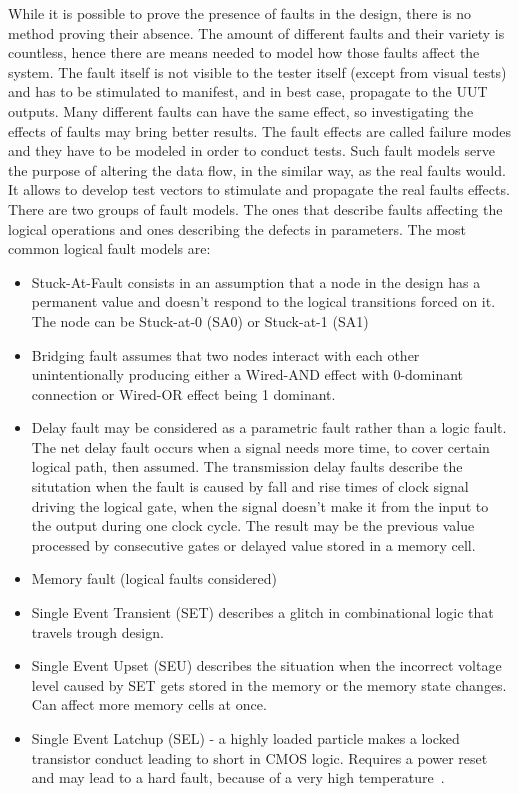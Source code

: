While it is possible to prove the presence of faults in the design, there is no method proving their absence. The amount of different faults and their variety is countless, hence there are means needed to model how those faults affect the system. The fault itself is not visible to the tester itself (except from visual tests) and has to be stimulated to manifest, and in best case, propagate to the UUT outputs. Many different faults can have the same effect, so investigating the effects of faults may bring better results. The fault effects are called failure modes and they have to be modeled in order to conduct tests. Such fault models serve the purpose of altering the data flow, in the similar way, as the real faults would. It allows to develop test vectors to stimulate and propagate the real faults effects. There are two groups of fault models. The ones that describe faults affecting the logical operations and ones describing the defects in parameters. The most common logical fault models are:
\begin{itemize}
    \item Stuck-At-Fault consists in an assumption that a node in the design has a permanent value and doesn't respond to the logical transitions forced on it. The node can be Stuck-at-0 (SA0) or Stuck-at-1 (SA1)
    \item Bridging fault assumes that two nodes interact with each other unintentionally producing either a Wired-AND effect with 0-dominant connection or Wired-OR effect being 1 dominant.
    \item Delay fault may be considered as a parametric fault rather than a logic fault. The net delay fault occurs when a signal needs more time, to cover certain logical path, then assumed. The transmission delay faults describe the situtation when the fault is caused by fall and rise times of clock signal driving the logical gate, when the signal doesn't make it from the input to the output during one clock cycle. The result may be the previous value processed by consecutive gates or delayed value stored in a memory cell.
    \item Memory fault (logical faults considered)
    \item Single Event Transient (SET) describes a glitch in combinational logic that travels trough design.
    \item Single Event Upset (SEU) describes the situation when the incorrect voltage level caused by SET gets stored in the memory or the memory state changes. Can affect more memory cells at once.
    \item Single Event Latchup (SEL) - a highly loaded particle makes a locked transistor conduct leading to short in CMOS logic. Requires a power reset and may lead to a hard fault, because of a very high temperature~\cite{report:altera}.
\end{itemize}
